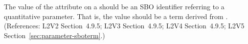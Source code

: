 The value of the  attribute on a \Parameter should be an SBO
identifier referring to a quantitative parameter.  That is, the value should
be a term derived from \sboparameter.  (References: L2V2 Section~4.9.5; L2V3
Section~4.9.5; L2V4 Section~4.9.5; L2V5 Section~\ref{sec:parameter-sboterm}.)

